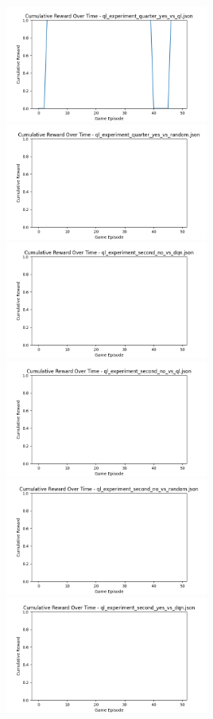 \includegraphics[width=0.5\textwidth]{images/cumulative_reward_ql_experiment_quarter_yes_vs_ql.png} 
\includegraphics[width=0.5\textwidth]{images/cumulative_reward_ql_experiment_quarter_yes_vs_random.png} 
\includegraphics[width=0.5\textwidth]{images/cumulative_reward_ql_experiment_second_no_vs_dqn.png} 
\includegraphics[width=0.5\textwidth]{images/cumulative_reward_ql_experiment_second_no_vs_ql.png} 
\includegraphics[width=0.5\textwidth]{images/cumulative_reward_ql_experiment_second_no_vs_random.png} 
\includegraphics[width=0.5\textwidth]{images/cumulative_reward_ql_experiment_second_yes_vs_dqn.png} 
